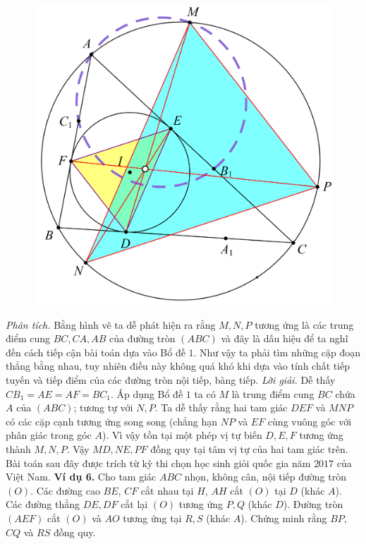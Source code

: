 \begin{multicols}{2}
\begin{figure}[H]
		\vspace*{-5pt}
		\centering
		\captionsetup{labelformat= empty, justification=centering}
		\includegraphics[width= 0.9\linewidth]{11}
		\vspace*{-10pt}
	\end{figure}
	\textit{Phân tích.} Bằng hình vẽ ta dễ phát hiện ra rằng $M,N,P$ tương ứng là các trung điểm cung $BC,CA,AB$ của đường tròn $(ABC)$ và đây là dấu hiệu để ta nghĩ đến cách tiếp cận bài toán dựa vào Bổ đề $1$. Như vậy ta phải tìm những cặp đoạn thẳng bằng nhau, tuy nhiên điều này không quá khó khi dựa vào tính chất tiếp tuyến và tiếp điểm của các đường tròn nội tiếp, bàng tiếp.
	\vskip 0.1cm
	\textit{Lời giải.} Dễ thấy $CB_1 =AE=AF=BC_1$. Áp dụng Bổ đề $1$ ta có $M$ là trung điểm cung $BC$ chứa $A$ của $(ABC)$; tương tự với $N,P.$ Ta dễ thấy rằng hai tam giác $DEF$ và $MNP$ có các cặp cạnh tương ứng song song (chẳng hạn $NP$ và $EF$ cùng vuông góc với phân giác trong góc $A$). Vì vậy tồn tại một phép vị tự biến $D,E,F$ tương ứng thành $M,N,P$. Vậy $MD,NE,PF$ đồng quy tại tâm vị tự của hai tam giác trên. 
	\vskip 0.1cm
	Bài toán sau đây được trích từ kỳ thi chọn học sinh giỏi quốc gia năm $2017$ của Việt Nam.
	\textbf{\color{hoccungpi}Ví dụ 6.} Cho tam giác $ABC$ nhọn, không cân, nội tiếp đường tròn $(O)$. Các đường cao $BE$, $CF$ cắt nhau tại $H$, $AH$ cắt $(O)$ tại $D$  (khác $A$). Các đường thẳng $DE,DF$ cắt lại $(O)$ tương ứng  $P,Q$ (khác $D$). Đường tròn $(AEF)$ cắt $(O)$ và $AO$ tương ứng tại $R,S$ (khác $A$). Chứng minh rằng $BP$, $CQ$ và $RS$ đồng quy.

\end{multicols}
